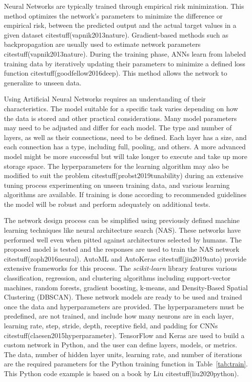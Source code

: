\documentclass[preprint,12pt]{elsarticle}
\begin{document}
Neural Networks are typically trained through empirical risk minimization. This method optimizes the network's parameters to minimize the difference or empirical risk, between the predicted output and the actual target values in a given dataset citestuff(vapnik2013nature). Gradient-based methods such as backpropagation are usually used to estimate network parameters  citestuff(vapnik2013nature). During the training phase, ANNs learn from labeled training data by iteratively updating their parameters to minimize a defined loss function citestuff(goodfellow2016deep). This method allows the network to generalize to unseen data.

Using Artificial Neural Networks requires an understanding of their characteristics. The model suitable for a specific task varies depending on how the data is stored and other practical considerations. Many model parameters may need to be adjusted and differ for each model. The type and number of layers, as well as their connections, need to be defined. Each layer has a size, and each connection has a type, including full, pooling, and others. A more advanced model might be more successful but will take longer to execute and take up more storage space. The hyperparameters for the learning algorithm may also be modified to suit the problem citestuff(probst2019tunability) during an extensive tuning process experimenting on unseen training data, and various learning algorithms are available. If training is done according to recommended guidelines the model will be robust and perform adequately on additional tests.

The network design process can be simplified using previously defined machine learning techniques like neural architecture search (NAS). These networks have performed well even when pitted against architectures selected by humans. The proposed model is tested and the responses are used to train the NAS network citestuff(zoph2016neural). AutoML and AutoKeras citestuff(jin2019auto) provide extensive frameworks for this process. The \textit{scikit-learn} library features various classification, regression, and clustering algorithms including support-vector machines, random forests, gradient boosting, k-means, and Density-Based Spatial Clustering (DBSCAN). These network models are ready to be used and trained once the data and hyperparameters are provided. The hyperparameters must be predefined, are not trained, and include how many neurons are in each layer, learning rate, step, stride, depth, receptive field, and padding for CNNs citestuff(claesen2015hyperparameter). TensorFlow and Keras are used to build a custom network in Python, and the user can define layers, models, or metrics. The data, number of hidden layer units, learning rate, and number of iterations are the required parameters for the Python training function in Table~\ref{tab:train}. This Python code example is based on a book by Liu citestuff(liu2020python).
\end{document}

